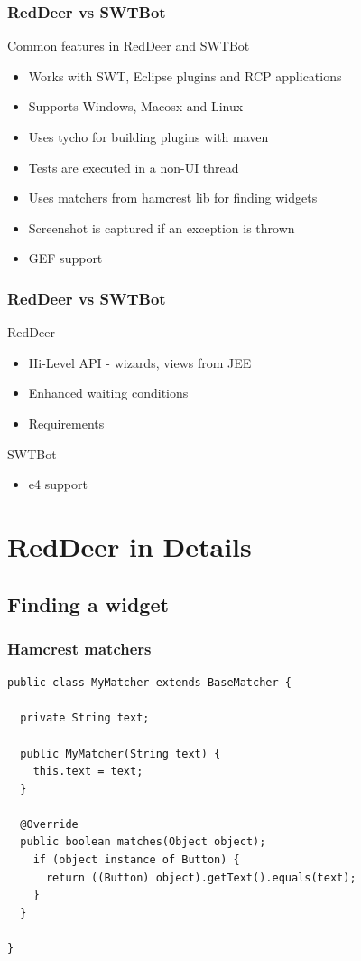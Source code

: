 \documentclass{beamer}
\begin{document}
\begin{frame}[fragile]
\frametitle{RedDeer vs SWTBot}
Common features in RedDeer and SWTBot
\begin{itemize}
\item Works with SWT, Eclipse plugins and RCP applications
\item Supports Windows, Macosx and Linux
\item Uses tycho for building plugins with maven
\item Tests are executed in a non-UI thread
\item Uses matchers from hamcrest lib for finding widgets
\item Screenshot is captured if an exception is thrown
\item GEF support
\end{itemize}
\end{frame}

\begin{frame}[fragile]
\frametitle{RedDeer vs SWTBot}
RedDeer
\begin{itemize}
\item Hi-Level API - wizards, views from JEE
\item Enhanced waiting conditions
\item Requirements
\end{itemize}
\vspace{0.5cm}
SWTBot
\begin{itemize}
\item e4 support
\end{itemize}
\end{frame}

\section{RedDeer in Details}

\subsection{Finding a widget}
\begin{frame}[fragile]
\frametitle{Hamcrest matchers}
\begin{lstlisting}
public class MyMatcher extends BaseMatcher {

  private String text;

  public MyMatcher(String text) {
    this.text = text;
  }
  
  @Override
  public boolean matches(Object object);
    if (object instance of Button) {
      return ((Button) object).getText().equals(text);
    }
  }

} 
\end{lstlisting}
\end{frame}
\end{document}
